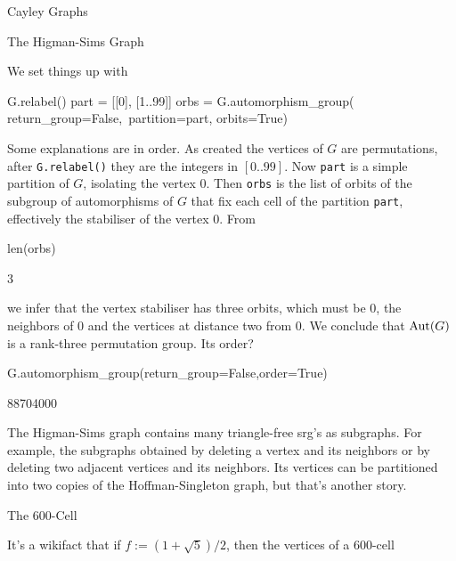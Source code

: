 \begin{chap}{Cayley Graphs}
\begin{sect}{The Higman-Sims Graph}
\begin{para}
We set things up with
\end{para}
%
\begin{sagecode}
\begin{sageinput}
G.relabel()
part = [[0], [1..99]]
orbs = G.automorphism_group( return_group=False,\
    partition=part, orbits=True)
\end{sageinput}
\end{sagecode}
%
\begin{para}
Some explanations are in order. As created the vertices of $G$ are permutations,
after \verb|G.relabel()| they are the integers in $[0..99]$. Now
\verb|part| is a simple partition of $G$, isolating the vertex $0$.  Then 
\verb|orbs| is the list of orbits of the subgroup of automorphisms of $G$
that fix each cell of the partition \texttt{part}, effectively the 
stabiliser of the vertex $0$. From
\end{para}
%
\begin{sagecode}
\begin{sageinput}
len(orbs)
\end{sageinput}
\begin{sageoutput}
3
\end{sageoutput}
\end{sagecode}
%
\begin{para}
we infer that the vertex stabiliser has three orbits, which must be 0,
the neighbors of 0 and the vertices at distance two from 0. We conclude
that $\mathrm{Aut}(G)$ is a rank-three permutation group. Its order?
\end{para}
%
\begin{sagecode}
\begin{sageinput}
G.automorphism_group(return_group=False,order=True)
\end{sageinput}
\begin{sageoutput}
88704000
\end{sageoutput}
\end{sagecode}
%
\begin{para}
The Higman-Sims graph contains many triangle-free srg's as subgraphs.
For example, the subgraphs obtained by deleting a vertex and its neighbors
or by deleting two adjacent vertices and its neighbors. Its vertices
can be partitioned into two copies of the Hoffman-Singleton graph,
but that's another story.
\end{para}
%
\end{sect}
%
\begin{sect}{The 600-Cell}
%
\begin{para}
It's a wikifact that if $f:=(1+\sqrt{5})/2$, then the vertices of a 600-cell 

\end{para}
\end{sect}
\end{chap}
